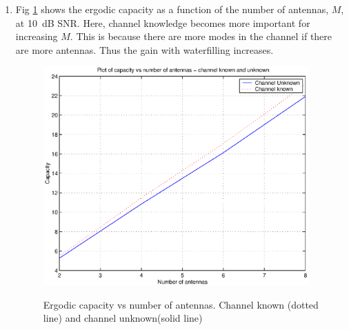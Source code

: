 \documentclass[12pt]{article}
\begin{document}
\begin{enumerate}
\item Fig \ref{fig:p1_erg_ant} shows the ergodic capacity as a function
of the number of antennas, $M$, at 10~dB SNR.  Here, channel
knowledge becomes more important for increasing $M$.  This is
because there are more modes in the channel if there are more
antennas. Thus the gain with waterfilling increases.
\begin{figure}
  \centering
  \includegraphics[width=4in]{p1c_vs_ntx.eps}\\
  \caption{\footnotesize Ergodic capacity vs number of antennas.
  Channel known (dotted line) and channel unknown(solid line)}
  \label{fig:p1_erg_ant}
\end{figure}
\end{enumerate}
\end{document}
